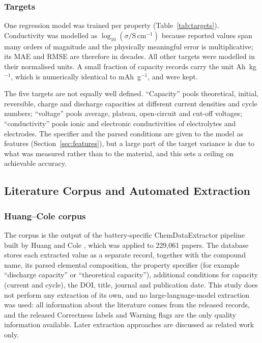 \documentclass[journal=jcisd8,manuscript=article,layout=traditional]{achemso}
\begin{document}
\subsubsection{Targets}
\label{sec:targets}

One regression model was trained per property (Table~\ref{tab:targets}). Conductivity was modelled as $\log_{10}(\sigma / \mathrm{S\,cm^{-1}})$ because reported values span many orders of magnitude and the physically meaningful error is multiplicative; its MAE and RMSE are therefore in decades. All other targets were modelled in their normalised units. A small fraction of capacity records carry the unit Ah~kg$^{-1}$, which is numerically identical to mAh~g$^{-1}$, and were kept.

The five targets are not equally well defined. ``Capacity'' pools theoretical, initial, reversible, charge and discharge capacities at different current densities and cycle numbers; ``voltage'' pools average, plateau, open-circuit and cut-off voltages; ``conductivity'' pools ionic and electronic conductivities of electrolytes and electrodes. The specifier and the parsed conditions are given to the model as features (Section~\ref{sec:features}), but a large part of the target variance is due to what was measured rather than to the material, and this sets a ceiling on achievable accuracy.

\subsection{Literature Corpus and Automated Extraction}

\subsubsection{Huang--Cole corpus}

The corpus is the output of the battery-specific ChemDataExtractor pipeline built by Huang and Cole \cite{huang2020database,huang2020figshare}, which was applied to 229,061 papers. The database stores each extracted value as a separate record, together with the compound name, its parsed elemental composition, the property specifier (for example ``discharge capacity'' or ``theoretical capacity''), additional conditions for capacity (current and cycle), the DOI, title, journal and publication date. This study does not perform any extraction of its own, and no large-language-model extraction was used: all information about the literature comes from the released records, and the released Correctness labels and Warning flags are the only quality information available. Later extraction approaches \cite{huang2022batterybert,xu2024atomworkbattery,dagdelen2024structured} are discussed as related work only.
\end{document}
